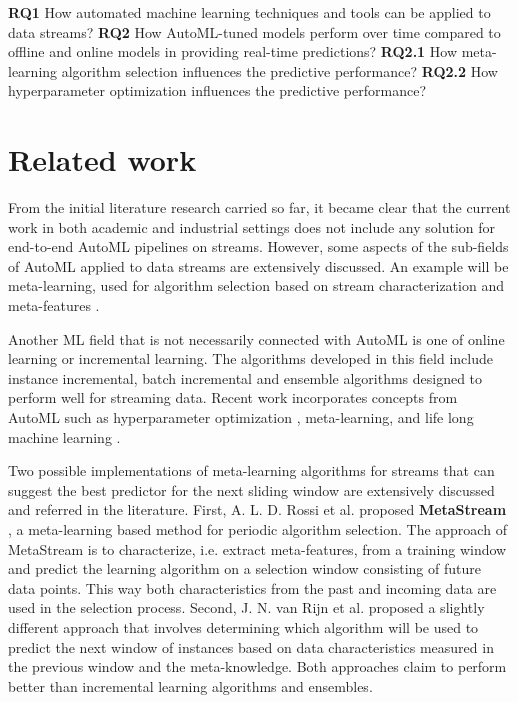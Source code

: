 \documentclass{sig-alternate-br}
\begin{document}
\textbf{RQ1} How automated machine learning techniques and tools can be applied to data streams?
\newline
\textbf{RQ2} How AutoML-tuned models perform over time compared to offline and online models in providing real-time predictions?
		\newline\-\hspace{0.5cm}\textbf{RQ2.1} How meta-learning algorithm selection influences the predictive performance?
        \newline\-\hspace{0.5cm}\textbf{RQ2.2} How hyperparameter optimization influences the predictive performance?


\section{Related work}
From the initial literature research carried so far, it became clear that the current work in both academic and industrial settings does not include any solution for end-to-end AutoML pipelines on streams. However, some aspects of the sub-fields of AutoML applied to data streams are extensively discussed. An example will be meta-learning, used for algorithm selection based on stream characterization and meta-features \cite{van2014algorithm, rossi2017guidance}.

Another ML field that is not necessarily connected with AutoML is one of online learning or incremental learning. The algorithms developed in this field include instance incremental, batch incremental and ensemble algorithms designed to perform well for streaming data. Recent work incorporates concepts from AutoML such as hyperparameter optimization \cite{veloso2018self}, meta-learning, and life long machine learning \cite{madrid2019towards}. 

Two possible implementations of meta-learning algorithms for streams that can suggest the best predictor for the next sliding window are extensively discussed and referred in the literature. First, A. L. D. Rossi et al. proposed \textbf{MetaStream} \cite{rossi2014metastream}, a meta-learning based method for periodic algorithm selection. The approach of MetaStream is to characterize, i.e. extract meta-features, from a training window and predict the learning algorithm on a selection window consisting of future data points. This way both characteristics from the past and incoming data are used in the selection process. Second, J. N. van Rijn et al. \cite{van2014algorithm} proposed a slightly different approach that involves determining which algorithm will be used to predict the next window of instances based on data characteristics measured in the previous window and the meta-knowledge. Both approaches claim to perform better than incremental learning algorithms and ensembles.
\end{document}
